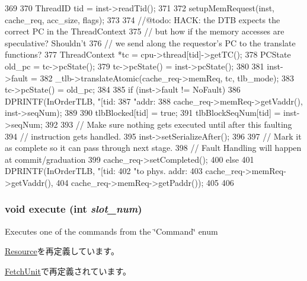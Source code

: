 \begin{DoxyCode}
369 {
370     ThreadID tid = inst->readTid();
371 
372     setupMemRequest(inst, cache_req, acc_size, flags);
373 
374     //@todo: HACK: the DTB expects the correct PC in the ThreadContext
375     //       but how if the memory accesses are speculative? Shouldn't
376     //       we send along the requestor's PC to the translate functions?
377     ThreadContext *tc = cpu->thread[tid]->getTC();
378     PCState old_pc = tc->pcState();
379     tc->pcState() = inst->pcState();
380 
381     inst->fault =
382         _tlb->translateAtomic(cache_req->memReq, tc, tlb_mode);
383     tc->pcState() = old_pc;
384 
385     if (inst->fault != NoFault) {
386         DPRINTF(InOrderTLB, "[tid:%
387                 "addr:%
388                 cache_req->memReq->getVaddr(), inst->seqNum);
389 
390         tlbBlocked[tid] = true;
391         tlbBlockSeqNum[tid] = inst->seqNum;
392 
393         // Make sure nothing gets executed until after this faulting
394         // instruction gets handled.
395         inst->setSerializeAfter();
396 
397         // Mark it as complete so it can pass through next stage.
398         // Fault Handling will happen at commit/graduation
399         cache_req->setCompleted();
400     } else {
401         DPRINTF(InOrderTLB, "[tid:%
402                 "to phys. addr:%
403                 cache_req->memReq->getVaddr(),
404                 cache_req->memReq->getPaddr());
405     }
406 }
\end{DoxyCode}
\hypertarget{classCacheUnit_a7b7fff82f8c9cbdb02add1346f60bb9e}{
\subsubsection[{execute}]{\setlength{\rightskip}{0pt plus 5cm}void execute (int {\em slot\_\-num})}}
\label{classCacheUnit_a7b7fff82f8c9cbdb02add1346f60bb9e}
Executes one of the commands from the \char`\"{}Command\char`\"{} enum 

\hyperlink{classResource_a39af49c5568d1db3f53c12d7d6914c32}{Resource}を再定義しています。

\hyperlink{classFetchUnit_a7b7fff82f8c9cbdb02add1346f60bb9e}{FetchUnit}で再定義されています。


